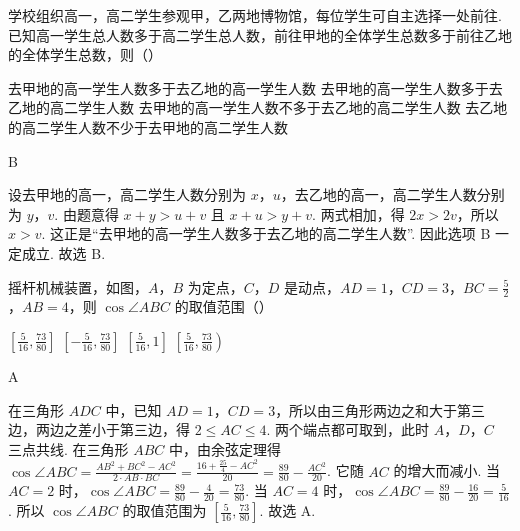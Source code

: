 \documentclass[UTF8,a4paper,oneside,11pt]{ctexbook}
\begin{document}
\begin{problem}
学校组织高一，高二学生参观甲，乙两地博物馆，每位学生可自主选择一处前往. 已知高一学生总人数多于高二学生总人数，前往甲地的全体学生总数多于前往乙地的全体学生总数，则（\quad）

\choices
    {去甲地的高一学生人数多于去乙地的高一学生人数}
    {去甲地的高一学生人数多于去乙地的高二学生人数}
    {去甲地的高一学生人数不多于去乙地的高二学生人数}
    {去乙地的高二学生人数不少于去甲地的高二学生人数}
\end{problem}

\begin{answer}
B
\end{answer}

\begin{solution}
设去甲地的高一，高二学生人数分别为 \(x\)，\(u\)，去乙地的高一，高二学生人数分别为 \(y\)，\(v\). 由题意得 \( x+y>u+v \) 且 \( x+u>y+v \).
两式相加，得 \( 2x>2v \)，所以 \( x>v \). 这正是“去甲地的高一学生人数多于去乙地的高二学生人数”.
因此选项 B 一定成立. 故选 B.
\end{solution}

\begin{problem}
摇杆机械装置，如图，\(A\)，\(B\) 为定点，\(C\)，\(D\) 是动点，\( AD=1 \)，\( CD=3 \)，\( BC=\frac{5}{2} \)，\( AB=4 \)，则 \( \cos \angle ABC \) 的取值范围（\quad）


\choices
    {\( \left[ \frac{5}{16},\frac{73}{80} \right] \)}
    {\( \left[ -\frac{5}{16},\frac{73}{80} \right] \)}
    {\( \left[ \frac{5}{16},1 \right] \)}
    {\( \left[ \frac{5}{16},\frac{73}{80} \right) \)}
\end{problem}

\begin{answer}
A
\end{answer}

\begin{solution}
在三角形 \(ADC\) 中，已知 \( AD=1 \)，\( CD=3 \)，所以由三角形两边之和大于第三边，两边之差小于第三边，得 \( 2\le AC\le 4 \). 两个端点都可取到，此时 \(A\)，\(D\)，\(C\) 三点共线.
在三角形 \(ABC\) 中，由余弦定理得 \( \cos \angle ABC=\frac{AB^2+BC^2-AC^2}{2\cdot AB\cdot BC}=\frac{16+\frac{25}{4}-AC^2}{20}=\frac{89}{80}-\frac{AC^2}{20} \).
它随 \(AC\) 的增大而减小. 当 \( AC=2 \) 时，\( \cos \angle ABC=\frac{89}{80}-\frac{4}{20}=\frac{73}{80} \). 当 \( AC=4 \) 时，\( \cos \angle ABC=\frac{89}{80}-\frac{16}{20}=\frac{5}{16} \).
所以 \( \cos \angle ABC \) 的取值范围为 \( \left[ \frac{5}{16},\frac{73}{80} \right] \). 故选 A.
\end{solution}
\end{document}
